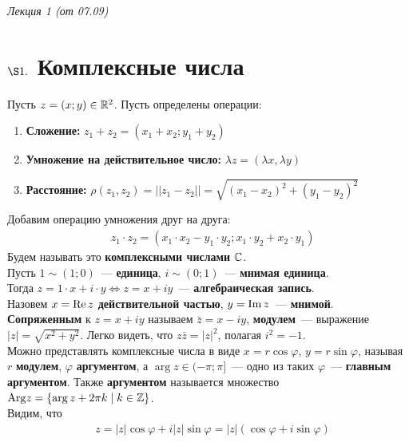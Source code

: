 \begin{flushright}
    \textit{Лекция 1 (от 07.09)}
\end{flushright}
\section{$\S 1.$ Комплексные числа}
\Def
Пусть $z = \left( x;y \right) \in \mathbb{R}^2$. Пусть определены операции:
\begin{enumerate}
    \item \textbf{Сложение:} $z_1 + z_2 = \left( x_1+x_2; y_1+y_2 \right)$
    \item \textbf{Умножение на действительное число:} $\lambda z = \left(\lambda
        x, \lambda y \right)$
    \item \textbf{Расстояние:} $\rho(z_1, z_2) = \left| \left| z_1 - z_2 \right|
    \right| = \sqrt{\left( x_1 - x_2 \right)^2 + (y_1 - y_2)^2}$
\end{enumerate}
Добавим операцию
умножения друг на друга:
\begin{align*}
  & z_1 \cdot z_2 = \left( x_1 \cdot x_2 - y_1 \cdot y_2; x_1 \cdot y_2 + x_2 \cdot y_1 \right)
\end{align*}
Будем называть это \textbf{комплексными числами} $\mathbb{C}$.
\\
Пусть $1 \sim (1; 0)$~--- \textbf{единица}, $i \sim (0;1)$~--- \textbf{мнимая
  единица}.
\\
Тогда $z = 1 \cdot x + i \cdot y \Leftrightarrow z = x + iy$~---
\textbf{алгебраическая запись}.
\\
Назовем $x = \mathrm{Re}\, z$ \textbf{действительной частью}, $y =
\mathrm{Im}\, z$~--- \textbf{мнимой}.
\\
\textbf{Сопряженным} к $z = x+iy$ называем $\bar{z} = x-iy$,
\textbf{модулем}~--- выражение $\left| z \right| = \sqrt{x^2+y^2}$. Легко
видеть, что $z\bar{z} = \left| z \right|^2$, полагая $i^2 = -1$.
\\
Можно представлять комплексные числа в виде $x = r \cos \varphi$, $y = r \sin
\varphi$, называя $r$ \textbf{модулем}, $\varphi$ \textbf{аргументом}, а $\arg z
\in (-\pi; \pi]$~--- одно из таких $\varphi$~--- \textbf{главным аргументом}.
Также \textbf{аргументом} называется множество $\mathrm{Arg} z = \left\{ \arg z + 2\pi k
    \mid k \in \mathbb{Z} \right\}$.
\\
Видим, что
\begin{align*}
  & z = \left| z \right|\cos \varphi + i \left| z \right|\sin \varphi = \left| z \right|\left( \cos \varphi + i \sin \varphi \right)
\end{align*}
